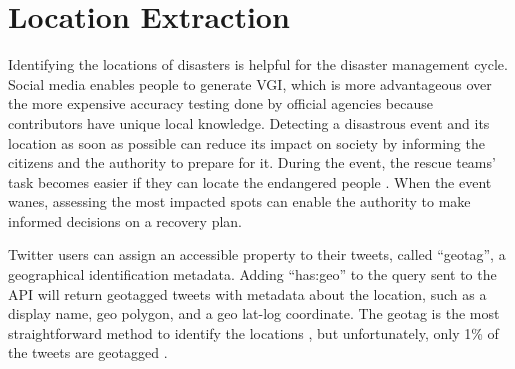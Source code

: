 \section{Location Extraction} 
Identifying the locations of disasters is helpful for the disaster
management cycle. Social media enables people to generate \ac{VGI}, which is more advantageous over
the more expensive accuracy testing done by official agencies because contributors have unique local
knowledge.  Detecting a disastrous event and its location as soon as possible can reduce its impact
on society \cite{debruijnGlobalDatabaseHistoric2019b} by informing the citizens and the authority to
prepare for it. During the event, the rescue teams' task becomes easier if they can locate the
endangered people \cite{singhEventClassificationLocation2019}. When the event wanes, assessing the
most impacted spots can enable the authority to make informed decisions on a recovery plan.

Twitter users can assign an accessible property to their tweets, called ``geotag'', a geographical
identification metadata. Adding ``has:geo'' to the query sent to the API will return geotagged
tweets with metadata about the location, such as a display name, geo polygon, and a geo lat-log
coordinate. The geotag is the most straightforward method to identify the locations 
\cite{fengExtractionPluvialFlood2018}, but unfortunately, only 1\% of the tweets are geotagged
\cite{middletonLocationExtractionSocial2018}.


